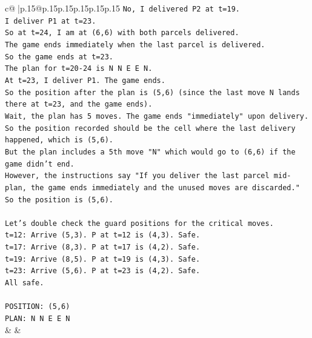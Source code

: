 \documentclass{article}
\begin{document}
{\begin{supertabular}{c@{$\;$}|p{.15\linewidth}@{}p{.15\linewidth}p{.15\linewidth}p{.15\linewidth}p{.15\linewidth}p{.15\linewidth}}
{{{\texttt{No, I delivered P2 at t=19.} \\
\texttt{I deliver P1 at t=23.} \\
\texttt{So at t=24, I am at (6,6) with both parcels delivered.} \\
\texttt{The game ends immediately when the last parcel is delivered.} \\
\texttt{So the game ends at t=23.} \\
\texttt{The plan for t=20{-}24 is N N E E N.} \\
\texttt{At t=23, I deliver P1. The game ends.} \\
\texttt{So the position after the plan is (5,6) (since the last move N lands there at t=23, and the game ends).} \\
\texttt{Wait, the plan has 5 moves. The game ends "immediately" upon delivery.} \\
\texttt{So the position recorded should be the cell where the last delivery happened, which is (5,6).} \\
\texttt{But the plan includes a 5th move "N" which would go to (6,6) if the game didn't end.} \\
\texttt{However, the instructions say "If you deliver the last parcel mid{-}plan, the game ends immediately and the unused moves are discarded."} \\
\texttt{So the position is (5,6).} \\
\\ 
\texttt{Let's double check the guard positions for the critical moves.} \\
\texttt{t=12: Arrive (5,3). P at t=12 is (4,3). Safe.} \\
\texttt{t=17: Arrive (8,3). P at t=17 is (4,2). Safe.} \\
\texttt{t=19: Arrive (8,5). P at t=19 is (4,3). Safe.} \\
\texttt{t=23: Arrive (5,6). P at t=23 is (4,2). Safe.} \\
\texttt{All safe.} \\
\\ 
\texttt{POSITION: (5,6)} \\
\texttt{PLAN: N N E E N} \\
            }
        }
    }
    & & \\ \\


\end{supertabular}}
\end{document}
